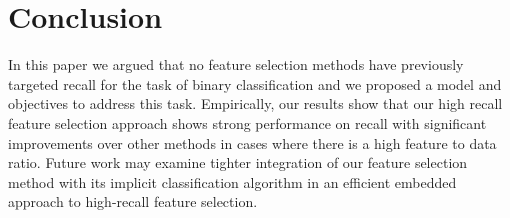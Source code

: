 \section{Conclusion}

In this paper we argued that no feature selection methods have
previously targeted recall for the task of binary classification and
we proposed a model and objectives to address this task.  Empirically,
our results show that our high recall feature selection approach shows
strong performance on recall with significant improvements over other
methods in cases where there is a high feature to data ratio.
Future work may examine tighter integration of our 
feature selection method with its implicit classification 
algorithm in an efficient embedded approach to high-recall feature selection.

